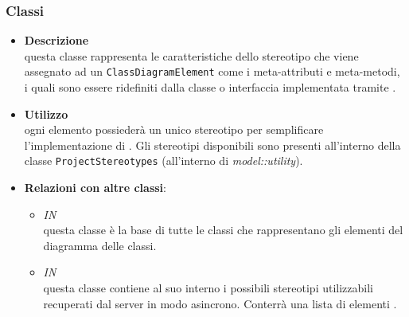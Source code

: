 \subsubsection{Classi}
\label{\nogloxy{swedesigner::client::model::celltypes::HxStereotype}}
\begin{figure}[h]
\centering
{}
\caption{}
\end{figure}
\FloatBarrier
\begin{itemize}
\item \textbf{Descrizione}\\
questa classe rappresenta le caratteristiche dello stereotipo che viene assegnato ad un \texttt{ClassDiagramElement} come i meta-attributi e meta-metodi, i quali sono essere ridefiniti dalla classe o interfaccia implementata tramite \proj{}. 
\item \textbf{Utilizzo}\\
ogni elemento possiederà un unico stereotipo per semplificare l'implementazione di \proj{}. Gli stereotipi disponibili sono presenti all'interno della classe \texttt{ProjectStereotypes} (all'interno di \emph{model::utility}).
\item \textbf{Relazioni con altre classi}:
\begin{itemize}
\item \textit{IN} \hyperref[\nogloxy{swedesigner::client::model::celltypes::class::ClassDiagramElement}]{}\\
questa classe è la base di tutte le classi che rappresentano gli elementi del diagramma delle classi.
\item \textit{IN} \hyperref[\nogloxy{swedesigner::client::model::utility::ProjectStereotypes}]{}\\
questa classe contiene al suo interno i possibili stereotipi utilizzabili recuperati dal server in modo asincrono. Conterrà una lista di elementi .
\end{itemize}
\end{itemize}
\subsection{}
\label{\nogloxy{swedesigner::client::model::celltypes::activity}}
